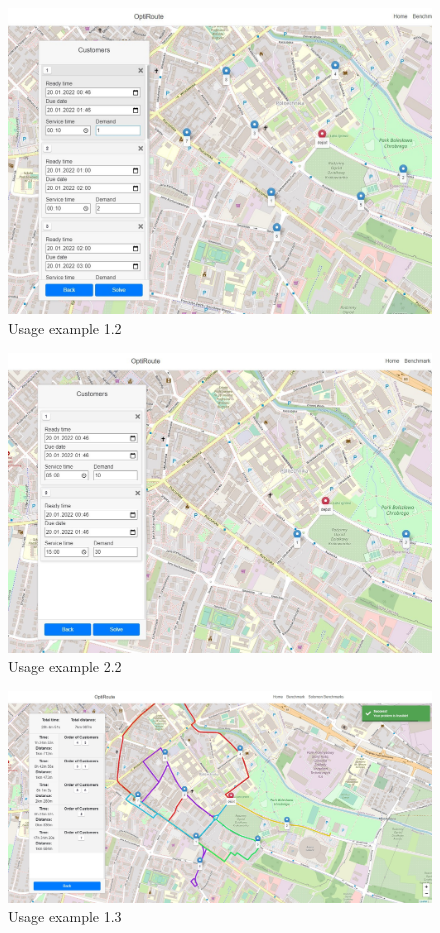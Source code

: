 \documentclass[a4paper,twoside,12pt]{book}
\begin{document}
\begin{figure}[htbp]
\centering
\includegraphics[width=\textwidth]{images/customersScenario1_updated.jpg}
\caption{Usage example 1.2}
\label{fig:customersScenario1}
\end{figure}

\begin{figure}[htbp]
\centering
\includegraphics[width=\textwidth]{images/customersScenario2_updated.jpg}
\caption{Usage example 2.2}
\label{fig:customersScenario2}
\end{figure}

\begin{figure}[htbp]
\centering
\includegraphics[width=\textwidth]{images/solutionSuccess.jpg}
\caption{Usage example 1.3}
\label{fig:solutionSuccess}
\end{figure}
\end{document}
